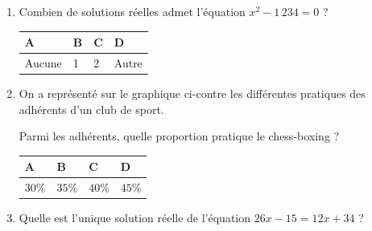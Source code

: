 \documentclass[oneside,12pt]{exam}          %
\begin{document}
\begin{enumerate}[label=\underline{Question \no\arabic*} :  , leftmargin=* , itemsep=5mm]

	\item Combien de solutions réelles admet l'équation $x^2 - 1\,234 = 0$ ?
	
		\hspace{\linewidth-\textwidth}
		\renewcommand{\arraystretch}{1.5}
		\begin{tabular}{| P{0.22\textwidth} | P{0.22\textwidth} | P{0.22\textwidth} | P{0.22\textwidth} |} \hline
			A & B & C & D \\ \hline
			Aucune & 1 & 2 & Autre \\ \hline
		\end{tabular}



	\item
	\begin{minipage}{0.45\textwidth} \restoreskip
		On a représenté sur le graphique ci-contre les différentes pratiques des adhérents d'un club de sport.
		
		Parmi les adhérents, quelle proportion pratique le chess-boxing ?
	\end{minipage}
	\begin{minipage}{0.35\textwidth}
	\end{minipage}
	
	
		\hspace{\linewidth-\textwidth}
		\renewcommand{\arraystretch}{1.5}
		\begin{tabular}{| P{0.22\textwidth} | P{0.22\textwidth} | P{0.22\textwidth} | P{0.22\textwidth} |} \hline
			A & B & C & D \\ \hline
			$30\%$& $35\%$ & $40\%$ & $45\%$ \\ \hline
		\end{tabular}
		
		

	\item Quelle est l'unique solution réelle de l'équation $26x - 15 = 12x + 34$ ?
	

\end{enumerate}
\end{document}
